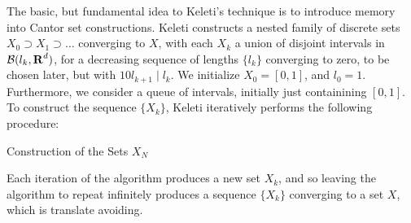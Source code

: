 The basic, but fundamental idea to Keleti's technique is to introduce memory into Cantor set constructions. Keleti constructs a nested family of discrete sets $X_0 \supset X_1 \supset \dots$ converging to $X$, with each $X_k$ a union of disjoint intervals in $\mathcal{B}(l_k, \operatorname{\mathbf{R}}^d)$, for a decreasing sequence of lengths $\{ l_k \}$ converging to zero, to be chosen later, but with $10 l_{k+1} \mid l_k$. We initialize $X_0 = [0,1]$, and $l_0 = 1$. Furthermore, we consider a queue of intervals, initially just containining $[0,1]$. To construct the sequence $\{ X_k \}$, Keleti iteratively performs the following procedure:
%
\begin{algorithm}
    \begin{algorithmic}%
        \caption{Construction of the Sets $X_N$}
        \MRepeat


            \EndForAll
        \EndRepeat   
    \end{algorithmic}
\end{algorithm}

Each iteration of the algorithm produces a new set $X_k$, and so leaving the algorithm to repeat infinitely produces a sequence $\{ X_k \}$ converging to a set $X$, which is translate avoiding.

